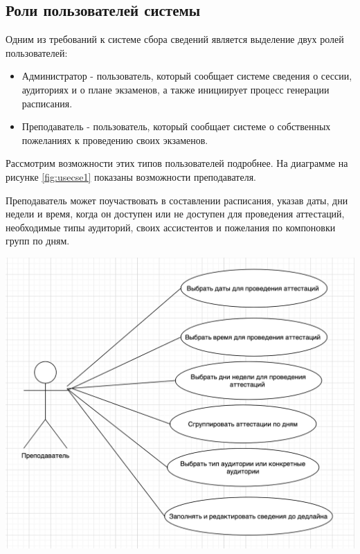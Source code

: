 \subsection{Роли пользователей системы}
Одним из требований к системе сбора сведений является выделение двух ролей пользователей:
\begin{itemize}
	\item Администратор - пользователь, который сообщает системе сведения о сессии, аудиториях и о плане экзаменов, а также инициирует процесс генерации расписания.
	\item Преподаватель - пользователь, который сообщает системе о собственных пожеланиях к проведению своих экзаменов.
\end{itemize}

Рассмотрим возможности этих типов пользователей подробнее. На диаграмме на рисунке \ref{fig:usecse1} показаны возможности преподавателя.

Преподаватель может поучаствовать в составлении расписания, указав даты, дни недели и время, когда он доступен или не доступен для проведения аттестаций, необходимые типы аудиторий, своих ассистентов и пожелания по компоновки групп по дням.

\begin{minipage}{\textwidth}
	\centering
	\vspace{\mfloatsep} %
	\includegraphics[scale=0.6, keepaspectratio=true] {my_folder/images/usecase1}
	\label{fig:usecse1}  
	\vspace{\mfloatsep} %
\end{minipage}

